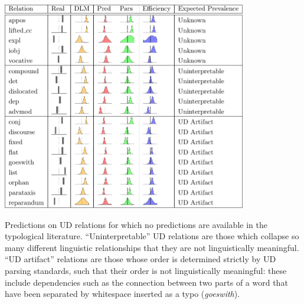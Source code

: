 \documentclass[10pt,twoside,lineno]{article}
\begin{document}





\begin{table} %
	\begin{center}	
\includegraphics[width=0.8\textwidth]{si-table-perrel-2-1.png}  
\end{center}
\caption{Predictions on UD relations for which no predictions are available in the typological literature.  ``Uninterpretable'' UD relations are those which collapse so many different linguistic relationships that they are not linguistically meaningful. ``UD artifact'' relations are those whose order is determined strictly by UD parsing standards, such that their order is not linguistically meaningful: these include dependencies such as the connection between two parts of a word that have been separated by whitespace inserted as a typo (\emph{goeswith}).}
\label{tab:all-predictions-2}
\end{table}
\end{document}
